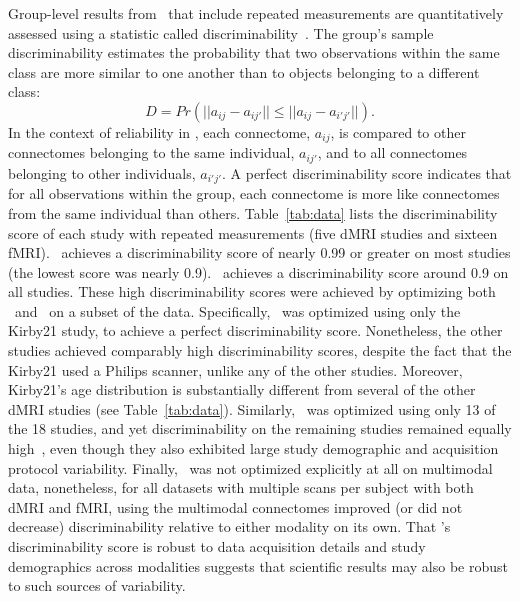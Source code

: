 \documentclass[11pt]{article}
\begin{document}
\begin{multicols}{2}
Group-level results from \ndmg~that include repeated measurements are quantitatively assessed using a statistic called discriminability~\cite{discriminability}.
The group's sample discriminability estimates the probability that two observations within the same class are more similar to one another than to objects belonging to a different class:
\begin{equation}
D = Pr(|| a_{ij} - a_{ij'} || \leq || a_{ij} - a_{i'j'} ||).
\label{eq:disc}
\end{equation}
In the context of reliability in \ndmg, each connectome, $a_{ij}$, is compared to other connectomes belonging to the same individual, $a_{ij'}$, and to all connectomes belonging to other individuals, $a_{i'j'}$.
A perfect discriminability score indicates that for all observations within the group, each connectome is more like connectomes from the same individual than others.
Table~\ref{tab:data} lists the discriminability score of each study with repeated measurements (five dMRI studies and sixteen fMRI).
 \ndmgd~achieves a discriminability score of nearly 0.99 or greater on most studies (the lowest score was nearly 0.9).  \ndmgf~achieves a discriminability score around 0.9 on all studies. 
These high discriminability scores  were achieved by optimizing both \ndmgd~and \ndmgf~on a subset of the data.  Specifically, \ndmgd~was optimized using only the Kirby21 study, to achieve a perfect discriminability score.  Nonetheless, the other studies achieved comparably high discriminability scores, despite the fact that the Kirby21 used a Philips scanner, unlike any of the other studies. Moreover, Kirby21's age distribution is substantially different from several of the other dMRI studies (see Table~\ref{tab:data}).  
Similarly, \ndmgf~was optimized using only 13 of the 18 studies, and yet discriminability on the remaining studies remained equally high~\cite{discriminability}, even though they also exhibited large study demographic and acquisition protocol variability.
Finally, \ndmg~was not optimized explicitly at all on multimodal data, nonetheless, for all datasets with multiple scans per subject with both dMRI and fMRI, using the multimodal connectomes improved (or did not decrease) discriminability relative to either modality on its own.
That \ndmg's discriminability score is robust to data acquisition details and study demographics across modalities suggests that scientific results may also be robust to such sources of variability.

 

\end{multicols}
\end{document}
